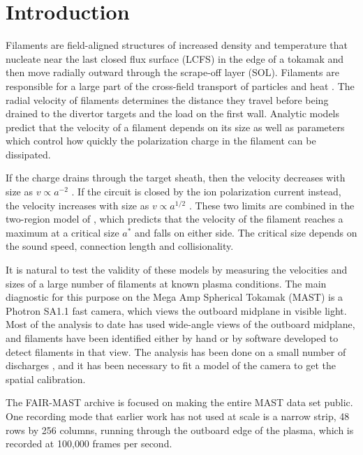 \section{Introduction}
\label{sec:intro}

Filaments are field-aligned structures of increased density and temperature that nucleate near the last closed flux surface (LCFS) in the edge of a tokamak and then move radially outward through the scrape-off layer (SOL). Filaments are responsible for a large part of the cross-field transport of particles and heat \citep{krasheninnikov2001scrape, zweben2007edge, dippolito2011convective}. The radial velocity of filaments determines the distance they travel before being drained to the divertor targets and the load on the first wall. Analytic models predict that the velocity of a filament depends on its size as well as parameters which control how quickly the polarization charge in the filament can be dissipated.

If the charge drains through the target sheath, then the velocity decreases with size as $v \propto a^{-2}$ \citep{krasheninnikov2001scrape}. If the circuit is closed by the ion polarization current instead, the velocity increases with size as $v \propto a^{1/2}$ \citep{garcia2006fluctuations}. These two limits are combined in the two-region model of \citet{myra2006collisionality}, which predicts that the velocity of the filament reaches a maximum at a critical size $a^*$ and falls on either side. The critical size depends on the sound speed, connection length and collisionality.

It is natural to test the validity of these models by measuring the velocities and sizes of a large number of filaments at known plasma conditions. The main diagnostic for this purpose on the Mega Amp Spherical Tokamak (MAST) is a Photron SA1.1 fast camera, which views the outboard midplane in visible light. Most of the analysis to date has used wide-angle views of the outboard midplane, and filaments have been identified either by hand or by software developed to detect filaments in that view. The analysis has been done on a small number of discharges \citep{dudson2008experiments, benayed2009interelm, kirk2016filaments, farley2019identification}, and it has been necessary to fit a model of the camera to get the spatial calibration.

The FAIR-MAST archive \citep{jackson2024fairmast} is focused on making the entire MAST data set public. One recording mode that earlier work has not used at scale is a narrow strip, 48 rows by 256 columns, running through the outboard edge of the plasma, which is recorded at 100{,}000 frames per second.

